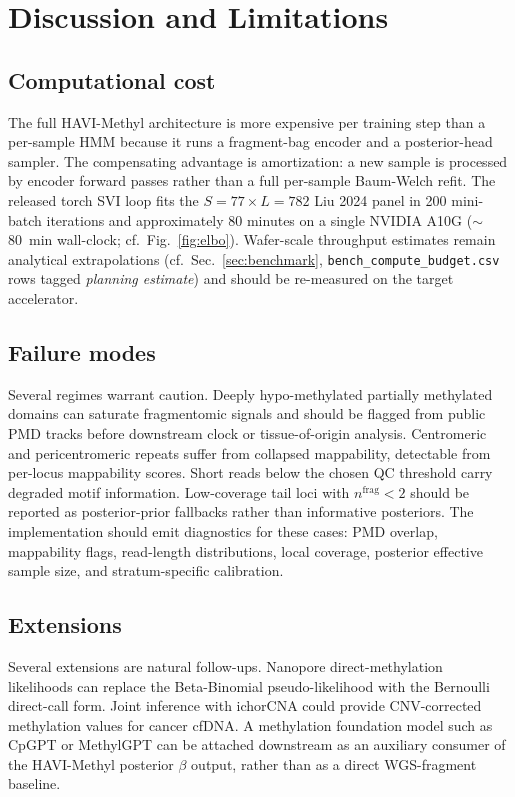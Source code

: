 \section{Discussion and Limitations}
\label{sec:discussion}

\subsection{Computational cost}
The full HAVI-Methyl architecture is more expensive per training step than a per-sample HMM because it runs a fragment-bag encoder and a posterior-head sampler. The compensating advantage is amortization: a new sample is processed by encoder forward passes rather than a full per-sample Baum-Welch refit. The released torch SVI loop fits the $S=77 \times L=782$ Liu 2024 panel in 200 mini-batch iterations and approximately 80 minutes on a single NVIDIA A10G ($\sim$80~min wall-clock; cf.\ Fig.~\ref{fig:elbo}). Wafer-scale throughput estimates remain analytical extrapolations (cf.\ Sec.~\ref{sec:benchmark}, \texttt{bench\_compute\_budget.csv} rows tagged \emph{planning estimate}) and should be re-measured on the target accelerator.

\subsection{Failure modes}
Several regimes warrant caution. Deeply hypo-methylated partially methylated domains can saturate fragmentomic signals and should be flagged from public PMD tracks before downstream clock or tissue-of-origin analysis. Centromeric and pericentromeric repeats suffer from collapsed mappability, detectable from per-locus mappability scores. Short reads below the chosen QC threshold carry degraded motif information. Low-coverage tail loci with $n^{\mathrm{frag}}<2$ should be reported as posterior-prior fallbacks rather than informative posteriors. The implementation should emit diagnostics for these cases: PMD overlap, mappability flags, read-length distributions, local coverage, posterior effective sample size, and stratum-specific calibration.

\subsection{Extensions}
Several extensions are natural follow-ups. Nanopore direct-methylation likelihoods can replace the Beta-Binomial pseudo-likelihood with the Bernoulli direct-call form. Joint inference with ichorCNA \citep{adalsteinsson2017ichor} could provide CNV-corrected methylation values for cancer cfDNA. A methylation foundation model such as CpGPT or MethylGPT can be attached downstream as an auxiliary consumer of the HAVI-Methyl posterior $\beta$ output, rather than as a direct WGS-fragment baseline.

